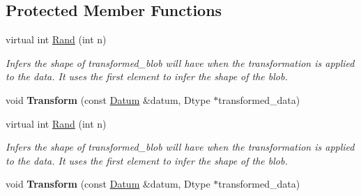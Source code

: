 \subsection*{Protected Member Functions}
\begin{DoxyCompactItemize}
\item 
virtual int \mbox{\hyperlink{classcaffe_1_1_data_transformer_ac3e52731074a73b05ff0527d2febc8f2}{Rand}} (int n)
\begin{DoxyCompactList}\small\item\em Infers the shape of transformed\+\_\+blob will have when the transformation is applied to the data. It uses the first element to infer the shape of the blob. \end{DoxyCompactList}\item 
\mbox{\label{classcaffe_1_1_data_transformer_a96c70b694d85f763934274e2fd92e6eb}} 
void {\bfseries Transform} (const \mbox{\hyperlink{classcaffe_1_1_datum}{Datum}} \&datum, Dtype $\ast$transformed\+\_\+data)
\item 
virtual int \mbox{\hyperlink{classcaffe_1_1_data_transformer_a8a1c9f19fc142e8d3bd1c4e2814975c2}{Rand}} (int n)
\begin{DoxyCompactList}\small\item\em Infers the shape of transformed\+\_\+blob will have when the transformation is applied to the data. It uses the first element to infer the shape of the blob. \end{DoxyCompactList}\item 
\mbox{\label{classcaffe_1_1_data_transformer_a96c70b694d85f763934274e2fd92e6eb}} 
void {\bfseries Transform} (const \mbox{\hyperlink{classcaffe_1_1_datum}{Datum}} \&datum, Dtype $\ast$transformed\+\_\+data)
\end{DoxyCompactItemize}
